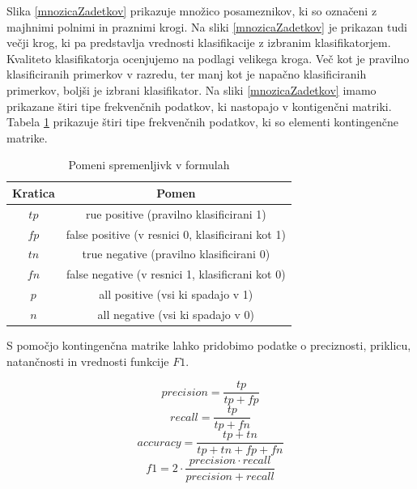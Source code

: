 \documentclass{acm_proc_article-sp}
\begin{document}
Slika \ref{mnozicaZadetkov} prikazuje množico posameznikov, ki so označeni z majhnimi polnimi in praznimi krogi.
Na sliki \ref{mnozicaZadetkov} je prikazan tudi večji krog, ki pa predstavlja vrednosti klasifikacije z izbranim klasifikatorjem.
Kvaliteto klasifikatorja ocenjujemo na podlagi velikega kroga.
Več kot je pravilno klasificiranih primerkov v razredu, ter manj kot je napačno klasificiranih primerkov, boljši je izbrani klasifikator.
Na sliki \ref{mnozicaZadetkov} imamo prikazane štiri tipe frekvenčnih podatkov, ki nastopajo v kontigenčni matriki. 
Tabela \ref{defConfmatrix} prikazuje štiri tipe frekvenčnih podatkov, ki so elementi kontingenčne matrike.

\begin{table}[h!]
	\centering
	\caption{Pomeni spremenljivk v formulah} \label{defConfmatrix}
	\begin{tabular}{|c|c|} 
		\hline
		\textbf{Kratica} & \textbf{Pomen} \\ \hline
		$ tp $ & rue positive (pravilno klasificirani 1) \\ \hline
		$ fp $ & false positive (v resnici 0, klasificirani kot 1) \\ \hline
		$ tn $ & true negative (pravilno klasificirani 0) \\ \hline
		$ fn $ & false negative (v resnici 1, klasificrani kot 0) \\ \hline
		$ p $ & all positive (vsi ki spadajo v 1) \\ \hline
		$ n $ & all negative (vsi ki spadajo v 0) \\ \hline
	\end{tabular}
\end{table}

S pomočjo kontingenčna matrike lahko pridobimo podatke o preciznosti, priklicu, natančnosti in vrednosti funkcije $ F1 $.

$$ precision = \frac{tp}{tp + fp} $$
$$ recall = \frac{tp}{tp + fn} $$
$$ accuracy = \frac{tp + tn}{tp + tn + fp + fn} $$
$$ f1 = 2 \cdot \frac{precision \cdot recall}{precision + recall} $$
\end{document}
